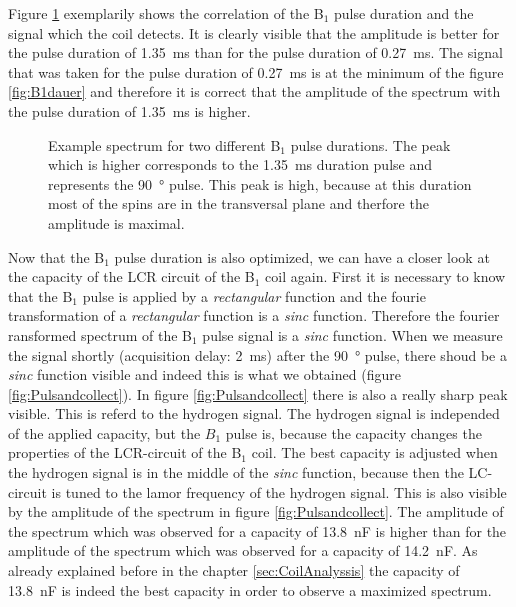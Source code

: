 Figure \ref{fig:pulsedurationbeispiel} exemplarily shows the correlation of the B$_1$ pulse duration and the signal which the coil detects. It is clearly visible that the amplitude is better for the pulse duration of \SI{1.35}{\milli \second} than for the pulse duration of \SI{0.27}{\milli \second}. The signal that was taken for the pulse duration of \SI{0.27}{\milli \second} is at the minimum of the figure \ref{fig:B1dauer} and therefore it is correct that the amplitude of the spectrum with the pulse duration of \SI{1.35}{\milli \second} is higher.
\begin{figure}[H]
    \centering
    
    \caption[Example spectrum for two different B$_1$ pulse durations.]{Example spectrum for two different B$_1$ pulse durations. The peak which is higher corresponds to the \SI{1.35}{\milli \second} duration pulse and represents the \SI{90}{\degree} pulse. This peak is high, because at this duration most of the spins are in the transversal plane and therfore the amplitude is maximal.}
    \label{fig:pulsedurationbeispiel}
\end{figure}
Now that the B$_1$ pulse duration is also optimized, we can have a closer look at the capacity of the LCR circuit of the B$_1$ coil again. First it is necessary to know that the B$_1$ pulse is applied by a \textit{rectangular} function and the fourie transformation of a \textit{rectangular} function is a \textit{sinc} function. Therefore the fourier ransformed spectrum of the B$_1$ pulse signal is a \textit{sinc} function. When we measure the signal shortly (acquisition delay: \SI{2}{\milli \second}) after the \SI{90}{\degree} pulse, there shoud be a \textit{sinc} function visible and indeed this is what we obtained (figure \ref{fig:Pulsandcollect}). In figure \ref{fig:Pulsandcollect} there is also a really sharp peak visible. This is referd to the hydrogen signal. The hydrogen signal is independed of the applied capacity, but the $B_1$ pulse is, because the capacity changes the properties of the LCR-circuit of the B$_1$ coil. The best capacity is adjusted when the hydrogen signal is in the middle of the \textit{sinc} function, because then the LC- circuit is tuned to the lamor frequency of the hydrogen signal. This is also visible by the amplitude of the spectrum in figure \ref{fig:Pulsandcollect}. The amplitude of the spectrum which was observed for a capacity of \SI{13.8}{\nano \farad} is higher than for the amplitude of the spectrum which was observed for a capacity of \SI{14.2}{\nano \farad}. As already explained before in the chapter \ref{sec:CoilAnalyssis} the capacity of \SI{13.8}{\nano \farad} is indeed the best capacity in order to observe a maximized spectrum.
